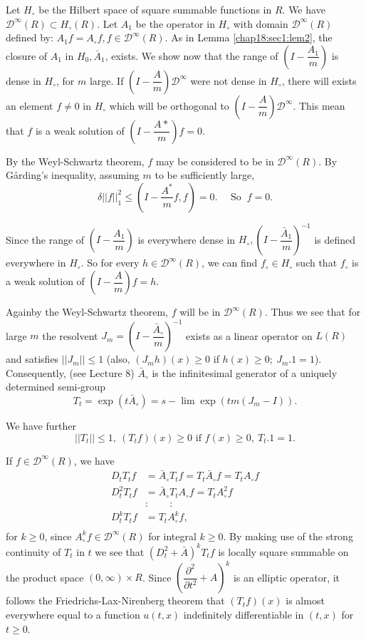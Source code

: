 Let $H_\circ$ be the Hilbert space of square summable functions in
$R$. We have $\mathscr{D}^\infty (R) \subset H_\circ (R)$. Let $A_1$
be the operator in $H_\circ$ with domain $\mathscr{D}^\infty (R)$
defined by: $A_1 f = A_\circ f, f \in \mathscr{D}^\infty (R)$. As in
Lemma \ref{chap18:sec1:lem2}, the closure of $A_1$ in $H_0, \bar{A}_1$, exists. We show
now that the range of $(I - \dfrac{A_1}{m})$ is dense in $H_\circ$,
for $m$ large. If $(I - \dfrac{A}{m}) \mathscr{D}^\infty$ were not
dense in $H_\circ$, there will exists an element $f \neq 0$ in
$H_\circ$ which will be orthogonal to $(I - \dfrac{A}{m})
\mathscr{D}^\infty$. This mean that $f$ is a weak solution of $\left(I -
\dfrac{A*}{m}\right) f=0$. 
 
By the Weyl-Schwartz theorem, $f$ may be considered to be in\break
$\mathscr{D}^\infty(R)$. By G\r{a}rding's inequality, assuming $m$ to be
sufficiently large, 
$$
\delta || f ||^2_1 \leq \left(I - \frac{A^*}{m}f, f\right)=0. \quad
\text{ So }~f=0. 
$$
 
Since the range of $\left(I - \dfrac{A_1}{m}\right)$ is everywhere dense in
$H_\circ, \left(I -\dfrac {\bar{A}_1}{m}\right)^{-1}$ is defined everywhere in
$H_\circ$. So for every $h \in \mathscr{D}^\infty (R)$, we can find
$f_\circ \in  H_\circ 
$ such that $f_\circ$ is a weak solution of $\left(I -
\dfrac{A}{m}\right) f = h$. 
 
 Again\pageoriginale by the Weyl-Schwartz theorem, $f$ will be in
 $\mathscr{D}^\infty (R)$. Thus we see that for large $m$ the
 resolvent $J_m = \left(I - \dfrac{\bar{A}_\circ}{m}\right)^{-1}$
 exists as a 
 linear operator on $L(R)$ and satisfies $|| J_m || \leq 1$ (also,
 $(J_m h) (x) \geq 0$ if $h(x) \geq 0;~J_m.1 =1$). Consequently, (see
 Lecture 8) $\bar{A}_\circ$ is the infinitesimal generator of a
 uniquely determined semi-group 
 $$
 T_t = \exp (t \bar{A}_\circ) = s-\lim \exp (t m (J_m - I)).
 $$
 
 We have further
 $$
 || T_t || \leq 1, ~(T_t f) (x) \geq 0 \text{ if } f(x) \geq 0,~ T_t.1 =1.
 $$
 
 If $f \in \mathscr{D}^\infty (R)$, we have
 \begin{align*}
  D_t T_t f & = \bar{A}_\circ T_t f=T_t \bar{A}_\circ f= T_t A_\circ f \\
  D^2_t T_t f & = \bar{A}_\circ T_t A_\circ f=T_t A^2_\circ f \\
  &: \qquad: \\
  D^k_t T_t f & = T_t A^k_\circ f,\\
 \end{align*}
 for $k \geq 0$, since $A^k_\circ f \in \mathscr{D}^\infty (R)$ for
 integral $k \geq 0$. By making use of the strong continuity of $T_t$
 in $t$ we see that $(D^2_t + \bar{A})^k T_t f$ is locally square
 summable on the product space $(0, \infty) \times R$. Since
 $(\dfrac{\partial^2}{\partial t^2}+A)^k$ is an elliptic operator, it
 follows the Friedrichs-Lax-Nirenberg theorem that $(T_t f)(x)$ is
 almost everywhere equal to a function $u (t, x)$ indefinitely
 differentiable in $(t, x)$ for $t \geq 0$. 
 
